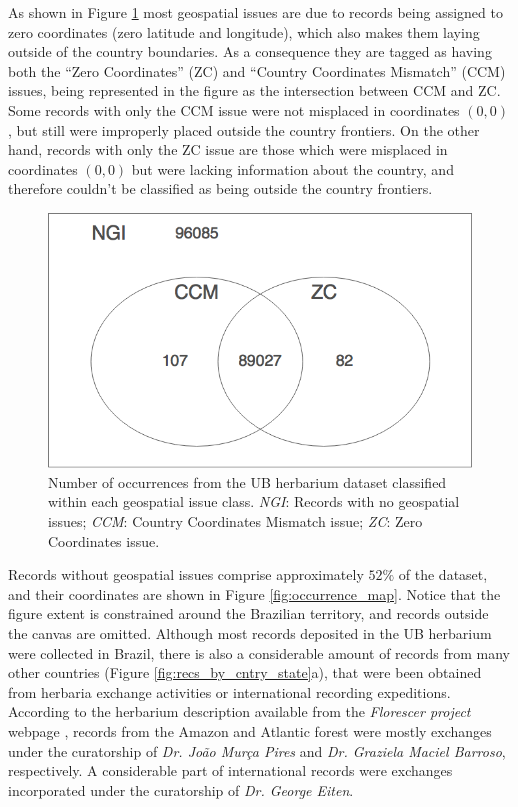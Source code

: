 As shown in Figure \ref{fig:venn_geospatial_issues} most geospatial issues are due to records being assigned to zero coordinates (zero latitude and longitude), which also makes them laying outside of the country boundaries. As a consequence they are tagged as having both the ``Zero Coordinates'' (ZC) and ``Country Coordinates Mismatch'' (CCM) issues, being represented in the figure as the intersection between CCM and ZC.
Some records with only the CCM issue were not misplaced in coordinates $(0,0)$, but still were improperly placed outside the country frontiers. 
On the other hand, records with only the ZC issue are those which were misplaced in coordinates $(0,0)$ but were lacking information about the country, and therefore couldn't be classified as being outside the country frontiers.

  \begin{figure}[h!]
  	\centering
    \includegraphics[width=0.6\linewidth]{figures/venn_geospatial_issues.png}
    \caption{Number of occurrences from the UB herbarium dataset classified within each geospatial issue class. \textit{NGI}: Records with no geospatial issues; \textit{CCM}: Country Coordinates Mismatch issue; \textit{ZC}: Zero Coordinates issue.}
    \label{fig:venn_geospatial_issues}
  \end{figure}

Records without geospatial issues comprise approximately $52\%$ of the dataset, and their coordinates are shown in Figure \ref{fig:occurrence_map}. Notice that the figure extent is constrained around the Brazilian territory, and records outside the canvas are omitted. Although most records deposited in the UB herbarium were collected in Brazil, there is also a considerable amount of records from many other countries (Figure \ref{fig:recs_by_cntry_state}a), that were been obtained from herbaria exchange activities or international recording expeditions. According to the herbarium description available from the \textit{Florescer project} webpage , records from the Amazon and Atlantic forest were mostly exchanges under the curatorship of \textit{Dr. João Murça Pires} and \textit{Dr. Graziela Maciel Barroso}, respectively. A considerable part of international records were exchanges incorporated under the curatorship of \textit{Dr. George Eiten}.  


